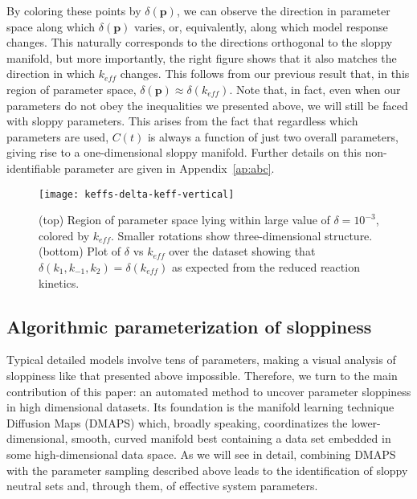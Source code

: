 By coloring these points by $\delta(\mathbf{p})$, we can observe the
direction in parameter space along which $\delta(\mathbf{p})$ varies,
or, equivalently, along which model response changes. This naturally
corresponds to the directions orthogonal to the sloppy manifold, but
more importantly, the right figure shows that it also matches the
direction in which $k_{eff}$ changes. This follows from our previous
result that, in this region of parameter space,
$\delta(\mathbf{p}) \approx \delta(k_{eff})$.  Note that, in fact,
even when our parameters do not obey the inequalities we presented
above, we will still be faced with sloppy parameters. This arises from
the fact that regardless which parameters are used, $C(t)$ is always a
function of just two overall parameters, giving rise to a
one-dimensional sloppy manifold. Further details on this
non-identifiable parameter are given in Appendix~\ref{ap:abc}.

\begin{figure}[ht!]
  \centering
  \texttt{[image: keffs-delta-keff-vertical]}
  \caption[Quantitative three-dimensional views of level sets of the
  effective parameter in a model of chemical kinetics]{(top) Region of
    parameter space lying within large value of $\delta = 10^{-3}$,
    colored by $k_{eff}$. Smaller rotations show three-dimensional
    structure. (bottom) Plot of $\delta$ vs $k_{eff}$ over the dataset
    showing that $\delta(k_1, k_{-1}, k_2) = \delta(k_{eff})$ as
    expected from the reduced reaction kinetics. \label{fig:abc-keff}
  }
\end{figure}

\subsection{Algorithmic parameterization of sloppiness}
Typical detailed models involve tens of parameters, making a visual
analysis of sloppiness like that presented above impossible.
Therefore, we turn to the main contribution of this paper: an
automated method to uncover parameter sloppiness in high dimensional
datasets.  Its foundation is the manifold learning technique Diffusion
Maps (DMAPS) which, broadly speaking, coordinatizes the
lower-dimensional, smooth, curved manifold best containing a data set
embedded in some high-dimensional data space.  As we will see in
detail, combining DMAPS with the parameter sampling described above
leads to the identification of sloppy neutral sets and, through them,
of effective system parameters.

